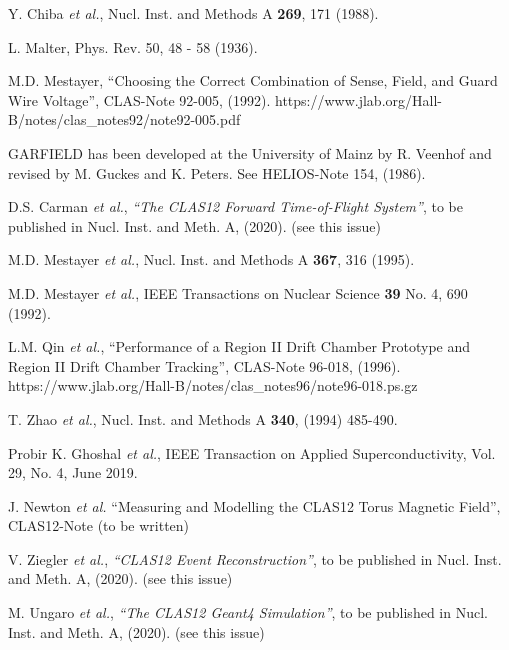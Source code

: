 \begin{thebibliography}{99}
Y. Chiba {\it et al.}, Nucl. Inst. and Methods A {\bf 269}, 171 (1988).

L. Malter, Phys. Rev. 50, 48 - 58 (1936).

M.D. Mestayer, ``Choosing the Correct Combination of Sense, Field, and Guard Wire Voltage'', CLAS-Note 
92-005, (1992). https://www.jlab.org/Hall-B/notes/clas\_notes92/note92-005.pdf

GARFIELD has been developed at the University of Mainz by R. Veenhof and
revised by M. Guckes and K. Peters.  See HELIOS-Note 154, (1986).

D.S. Carman {\it et al.}, {\it ``The CLAS12 Forward Time-of-Flight System''}, to be published in Nucl. Inst.
and Meth. A, (2020). (see this issue)

M.D. Mestayer {\it et al.}, Nucl. Inst. and Methods A {\bf 367}, 316 (1995).

M.D. Mestayer {\it et al.}, IEEE Transactions on Nuclear Science {\bf 39} No. 4, 690 (1992).

L.M. Qin {\it et al.}, ``Performance of a Region II Drift Chamber Prototype and Region II Drift
Chamber Tracking'', CLAS-Note 96-018, (1996).
https://www.jlab.org/Hall-B/notes/clas\_notes96/note96-018.ps.gz

T. Zhao {\it et al.}, Nucl. Inst. and Methods A {\bf 340}, (1994) 485-490.


Probir K. Ghoshal {\it et al.}, IEEE Transaction on Applied Superconductivity, Vol. 29, No. 4, June 2019.

J. Newton {\it et al.} ``Measuring and Modelling the CLAS12 Torus Magnetic Field'', CLAS12-Note (to be written)

V. Ziegler {\it et al.}, {\it ``CLAS12 Event Reconstruction''}, to be published in Nucl. Inst.
and Meth. A, (2020). (see this issue)

M. Ungaro {\it et al.}, {\it ``The CLAS12 Geant4 Simulation''}, to be published in Nucl. Inst.
and Meth. A, (2020). (see this issue)

\end{thebibliography}

